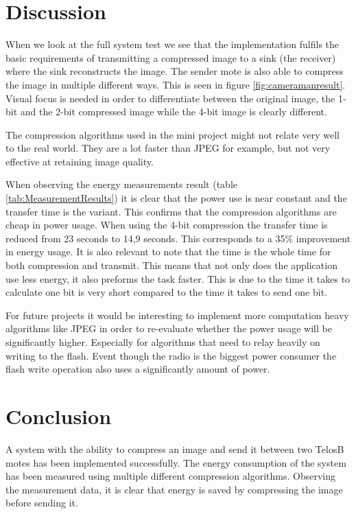 \section{Discussion}
When we look at the full system test we see that the implementation fulfils the basic requirements of transmitting a compressed image to a sink (the receiver) where the sink reconstructs the image. The sender mote is also able to compress the image in multiple different ways. This is seen in figure \ref{fig:cameramanresult}. Visual focus is needed in order to differentiate between the original image, the 1-bit and the 2-bit compressed image while the 4-bit image is clearly different.

The compression algorithms used in the mini project might not relate very well to the real world. They are a lot faster than  JPEG for example, but not very effective at retaining image quality.

When observing the energy measurements result (table \ref{tab:MeasurementResults}) it is clear that the power use is near constant and the transfer time is the variant. This confirms that the compression algorithms are cheap in power usage. When using the 4-bit compression the transfer time is reduced from 23 seconds to 14,9 seconds. This corresponds to a 35\% improvement in energy usage. It is also relevant to note that the time is the whole time for both compression and transmit. This means that not only does the application use less energy, it also preforms the task faster. This is due to the time it takes to calculate one bit is very short compared to the time it takes to send one bit. 

For future projects it would be interesting to implement more computation heavy algorithms like JPEG in order to re-evaluate whether the power usage will be significantly higher. Especially for algorithms that need to relay heavily on writing to the flash. Event though the radio is the biggest power consumer the flash write operation also uses a significantly amount of power. 

\section{Conclusion}
A system with the ability to compress an image and send it between two TelosB motes has been implemented successfully. The energy consumption of the system has been measured using multiple different compression algorithms. Observing the measurement data, it is clear that energy is saved by compressing the image before sending it. 